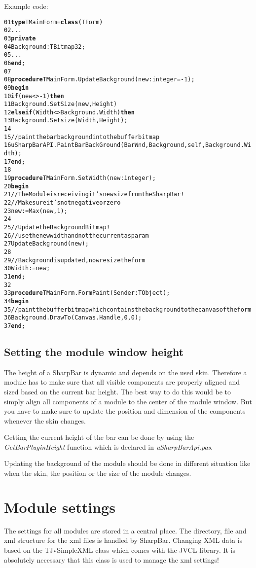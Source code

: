 \documentclass[a4paper]{article}
\begin{document}
    Example code: 
\begin{alltt}
01  {\bf type} TMainForm = {\bf class}(TForm)
02     ...
03    {\bf private}
04      Background : TBitmap32;
05      ...
06    {\bf end};
07
08  {\bf procedure} TMainForm.UpdateBackground(new : integer = -1);
09  {\bf begin}
10    {\bf if} (new <> -1) {\bf then}
11      Background.SetSize(new,Height)
12    {\bf else if} (Width <> Background.Width){\bf then}
13      Background.Setsize(Width,Height);
14
15    // paint the bar background into the buffer bitmap
16    uSharpBarAPI.PaintBarBackGround(BarWnd,Background,self,Background.Width);
17  {\bf end};
18 
19  {\bf procedure} TMainForm.SetWidth(new : integer);
20  {\bf begin}
21    // The Module is receiving it's new size from the SharpBar!
22    // Make sure it's not negative or zero
23    new := Max(new,1);
24 
25    // Update the Background Bitmap!
26    // use the new width and not the current as param
27    UpdateBackground(new);
28 
29    // Background is updated, now resize the form
30    Width := new;
31  {\bf end};
32
33  {\bf procedure} TMainForm.FormPaint(Sender: TObject);
34  {\bf begin}
35    // paint the buffer bitmap which contains the background to the canvas of the form
36    Background.DrawTo(Canvas.Handle,0,0);
37  {\bf end};
\end{alltt}

\newpage
  \subsection{Setting the module window height}
    The height of a SharpBar is dynamic and depends on the used skin. Therefore a module has to make sure that all visible components are properly aligned and sized based on the current bar height. The best way to do this would be to simply align all components of a module to the center of the module window. But you have to make sure to update the position and dimension of the components whenever the skin changes. 

    Getting the current height of the bar can be done by using the {\it GetBarPluginHeight} function which is declared in {\it uSharpBarApi.pas}.

    Updating the background of the module should be done in different situation like when the skin, the position or the size of the module changes.  
\section{Module settings}
  The settings for all modules are stored in a central place. The directory, file and xml structure for the xml files is handled by SharpBar. 
  Changing XML data is based on the TJvSimpleXML class which comes with the JVCL library. It is absolutely necessary that this class is used to manage the xml settings! 
\end{document}
